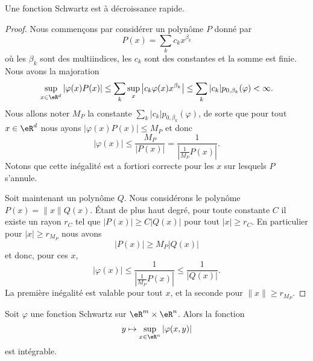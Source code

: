 \begin{proposition} \label{PropCSmzwGv}
    Une fonction Schwartz est à décroissance rapide.
\end{proposition}

\begin{proof}
    Nous commençons par considérer un polynôme \( P\) donné par
    \begin{equation}
        P(x)=\sum_kc_kx^{\beta_k}
    \end{equation}
    où les \( \beta_k\) sont des multiindices, les \( c_k\) sont des constantes et la somme est finie. Nous avons la majoration
    \begin{equation}
        \sup_{x\in \eR^d}| \varphi(x)P(x) |\leq\sum_k\sup_x\big| c_k\varphi(x) x^{\beta_k} \big|\leq\sum_k| c_k |p_{0,\beta_k}(\varphi)<\infty.
    \end{equation}
    Nous allons noter \( M_P\) la constante \( \sum_k| c_k |p_{0,\beta_k}(\varphi)\), de sorte que pour tout \( x\in \eR^d\) nous ayons \( | \varphi(x)P(x) |\leq M_P\) et donc
    \begin{equation}
        | \varphi(x) |\leq \frac{ M_P }{ | P(x) | }=\frac{1}{ | \frac{1}{ M_P }P(x) | }.
    \end{equation}
    Notons que cette inégalité est a fortiori correcte pour les \( x\) sur lesquels \( P\) s'annule.

    Soit maintenant un polynôme \( Q\). Nous considérons le polynôme \( P(x)=\| x \|Q(x)\). Étant de plus haut degré, pour toute constante \( C\) il existe un rayon \( r_C\) tel que \( | P(x) |\geq C| Q(x) |\) pour tout \( | x |\geq r_C\). En particulier pour \( | x |\geq r_{M_P}\) nous avons
    \begin{equation}
        | P(x) |\geq M_P| Q(x) |
    \end{equation}
    et donc, pour ces \( x\),
    \begin{equation}
        | \varphi(x) |\leq \frac{1}{ | \frac{1}{ M_P }P(x) | }\leq \frac{1}{ | Q(x) | }.
    \end{equation}
    La première inégalité est valable pour tout \( x\), et la seconde pour \( \| x \|\geq r_{M_P}\).
\end{proof}

\begin{corollary}        \label{CORooZFPSooHCFUSH}
    Soit \( \varphi\) une fonction Schwartz sur \( \eR^m\times \eR^n\). Alors la fonction
    \begin{equation}
        y\mapsto \sup_{x\in \eR^n}| \varphi(x,y) |
    \end{equation}
    est intégrable.
\end{corollary}

